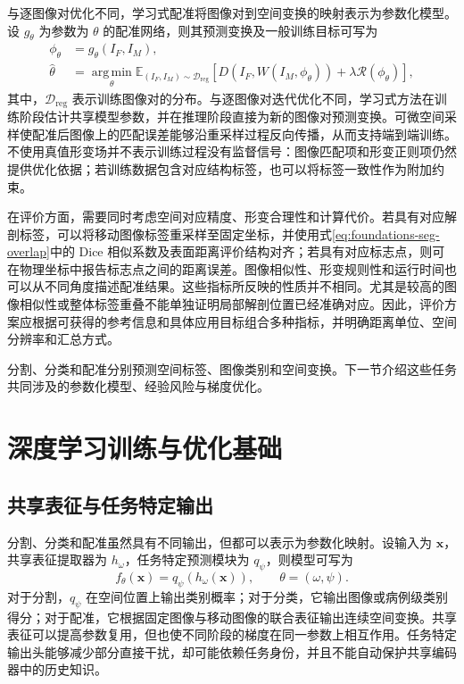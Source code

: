 与逐图像对优化不同，学习式配准将图像对到空间变换的映射表示为参数化模型。设 $g_{\theta}$ 为参数为 $\theta$ 的配准网络，则其预测变换及一般训练目标可写为
\begin{equation}
\begin{aligned}
\phi_{\theta}
&=g_{\theta}(I_F,I_M),\\
\widehat{\theta}
&=
\operatorname*{arg\,min}_{\theta}
\mathbb{E}_{(I_F,I_M)\sim\mathcal{D}_{\mathrm{reg}}}
\left[
D\!\left(I_F,W(I_M,\phi_{\theta})\right)
+\lambda\mathcal{R}(\phi_{\theta})
\right],
\end{aligned}
\label{eq:foundations-reg-learning}
\end{equation}
其中，$\mathcal{D}_{\mathrm{reg}}$ 表示训练图像对的分布。与逐图像对迭代优化不同，学习式方法在训练阶段估计共享模型参数，并在推理阶段直接为新的图像对预测变换\cite{balakrishnan2019voxelmorph}。可微空间采样使配准后图像上的匹配误差能够沿重采样过程反向传播，从而支持端到端训练\cite{jaderberg2015stn}。不使用真值形变场并不表示训练过程没有监督信号：图像匹配项和形变正则项仍然提供优化依据；若训练数据包含对应结构标签，也可以将标签一致性作为附加约束\cite{balakrishnan2019voxelmorph}。

在评价方面，需要同时考虑空间对应精度、形变合理性和计算代价。若具有对应解剖标签，可以将移动图像标签重采样至固定坐标，并使用式\eqref{eq:foundations-seg-overlap}中的 Dice 相似系数及表面距离评价结构对齐；若具有对应标志点，则可在物理坐标中报告标志点之间的距离误差。图像相似性、形变规则性和运行时间也可以从不同角度描述配准结果\cite{klein2009evaluation,wang2024samcl}。这些指标所反映的性质并不相同。尤其是较高的图像相似性或整体标签重叠不能单独证明局部解剖位置已经准确对应\cite{rohlfing2012surrogates}。因此，评价方案应根据可获得的参考信息和具体应用目标组合多种指标，并明确距离单位、空间分辨率和汇总方式。

分割、分类和配准分别预测空间标签、图像类别和空间变换。下一节介绍这些任务共同涉及的参数化模型、经验风险与梯度优化。

\section{深度学习训练与优化基础}
\label{sec:foundations-deep-optimization}

\subsection{共享表征与任务特定输出}
\label{subsec:foundations-representation-output}

分割、分类和配准虽然具有不同输出，但都可以表示为参数化映射。设输入为 $\mathbf{x}$，共享表征提取器为 $h_{\omega}$，任务特定预测模块为 $q_{\psi}$，则模型可写为
\begin{equation}
f_{\theta}(\mathbf{x})
=
q_{\psi}\!\left(h_{\omega}(\mathbf{x})\right),
\qquad
\theta=(\omega,\psi).
\label{eq:foundations-representation-head}
\end{equation}
对于分割，$q_{\psi}$ 在空间位置上输出类别概率；对于分类，它输出图像或病例级类别得分；对于配准，它根据固定图像与移动图像的联合表征输出连续空间变换。共享表征可以提高参数复用，但也使不同阶段的梯度在同一参数上相互作用。任务特定输出头能够减少部分直接干扰，却可能依赖任务身份，并且不能自动保护共享编码器中的历史知识。


